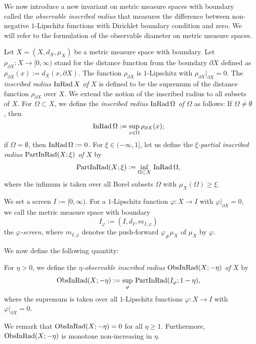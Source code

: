 We now introduce a new invariant on metric measure spaces with boundary called the \textit{observable inscribed radius}
that measures the difference between non-negative $1$-Lipschitz functions with Dirichlet boundary condition and zero.
We will refer to the formulation of the observable diameter on metric measure spaces.

Let $X=(X,d_{X},\mu_{X})$ be a metric measure space with boundary.
Let $\rho_{\partial X}:X\to [0,\infty)$ stand for the distance function from the boundary $\partial X$ defined as $\rho_{\partial X}(x):=d_{X}(x,\partial X)$.
The function $\rho_{\partial X}$ is $1$-Lipschitz with $\rho_{\partial X}|_{\partial X}=0$.
The \textit{inscribed radius $\operatorname{InRad} X$ of $X$} is defined to be the supremum of the distance function $\rho_{\partial X}$ over $X$.
We extend the notion of the inscribed radius to all subsets of $X$.
For $\Omega \subset X$,
we define the \textit{inscribed radius $\operatorname{InRad} \Omega$ of $\Omega$} as follows:
If $\Omega \neq \emptyset$,
then
\begin{equation}\label{eq:inscribed radius}
\operatorname{InRad} \Omega:=\sup_{x \in \Omega} \rho_{\partial X}(x);
\end{equation}
if $\Omega=\emptyset$,
then $\operatorname{InRad} \Omega:=0$.
For $\xi \in (-\infty,1]$,
let us define the \textit{$\xi$-partial inscribed radius $\operatorname{PartInRad}(X;\xi)$ of $X$} by
\begin{equation}\label{eq:partial inscribed radius}
\operatorname{PartInRad}(X;\xi):=\inf_{\Omega \subset X}\,\operatorname{InRad} \Omega,
\end{equation}
where the infimum is taken over all Borel subsets $\Omega$ with $\mu_{X}(\Omega) \geq \xi$.

We set a screen $I:= [0,\infty)$.
For a $1$-Lipschitz function $\varphi:X\to I$ with $\varphi|_{\partial X}=0$,
we call the metric measure space with boundary
\begin{equation}\label{eq:screen}
I_{\varphi}:=\left(I,d_{I},m_{I,\varphi}\right)
\end{equation}
the \textit{$\varphi$-screen},
where $m_{I,\varphi}$ denotes the push-forward $\varphi_{\#}\mu_{X}$ of $\mu_{X}$ by $\varphi$.

We now define the following quantity:
\begin{defi}\label{defi:observable inscribed radius}
For $\eta>0$,
we define the \textit{$\eta$-observable inscribed radius $\operatorname{ObsInRad}(X;-\eta)$ of $X$} by
\begin{equation*}
\operatorname{ObsInRad}(X;-\eta):=\sup_{\varphi}\,\operatorname{PartInRad}(I_{\varphi};1-\eta),
\end{equation*}
where the supremum is taken over all $1$-Lipschitz functions $\varphi:X\to I$ with $\varphi|_{\partial X}=0$.
\end{defi}
We remark that
$\operatorname{ObsInRad}(X;-\eta)=0$ for all $\eta \geq 1$.
Furthermore,
$\operatorname{ObsInRad}(X;-\eta)$ is monotone non-increasing in $\eta$.

